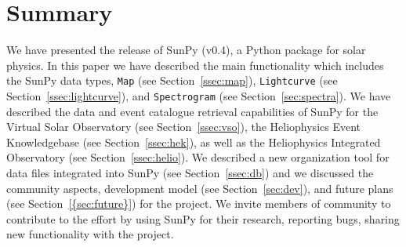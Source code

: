 \section{Summary}
We have presented the release of SunPy (v0.4), a Python package for solar physics. In
this paper we have described the main functionality which includes the SunPy data types, 
\texttt{Map} (see Section~\ref{ssec:map}), \texttt{Lightcurve} (see Section~\ref{ssec:lightcurve}), and \texttt{Spectrogram} (see Section~\ref{sec:spectra}).
We have described the data and event catalogue retrieval capabilities of SunPy for
the Virtual Solar Observatory (see Section~\ref{ssec:vso}), the Heliophysics Event Knowledgebase (see Section~\ref{ssec:hek}), as well as
the Heliophysics Integrated Observatory (see Section~\ref{ssec:helio}). We described
a new organization tool for data files integrated into SunPy (see Section~\ref{ssec:db}) 
and we discussed the community aspects, development model (see Section~\ref{sec:dev}), and future plans (see Section~\ref{{sec:future}}) for the project.
We invite members of community to contribute to the effort by using SunPy for their 
research, reporting bugs, sharing new functionality with the project.